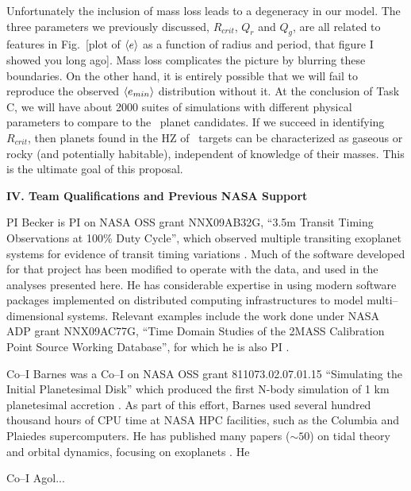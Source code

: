 Unfortunately the inclusion of mass loss leads to a degeneracy in our
model.  The three parameters we previously discussed, $R_{crit}$,
$Q_r$ and $Q_g$, are all related to features in Fig.~[plot of
  $\left< e \right>$ as a function of radius and period, that figure I showed
  you long ago].  Mass loss complicates the picture by blurring these
boundaries.  On the other hand, it is entirely possible that we will
fail to reproduce the observed $\left< e_{min} \right>$ distribution without
it.  At the conclusion of Task C, we will have about 2000 suites of
simulations with different physical parameters to compare to the
\kepler~planet candidates.  If we succeed in identifying $R_{crit}$,
then planets found in the HZ of \kepler~targets can be characterized
as gaseous or rocky (and potentially habitable), independent of
knowledge of their masses.  This is the ultimate goal of this
proposal.

\bigskip
\centerline{\bf IV. Team Qualifications and Previous NASA Support}
\smallskip

PI Becker is PI on NASA OSS grant NNX09AB32G, ``3.5m Transit Timing
Observations at 100\% Duty Cycle'', which observed multiple transiting
exoplanet systems for evidence of transit timing variations
\citep{2011ApJ...731..123K, 2013ApJ...764....8K, 2013ApJ...764L..17B,
  2013arXiv1304.5713K}.  Much of the software developed for that
project has been modified to operate with the \kepler data, and used in
the analyses presented here.  He has considerable expertise in using
modern software packages implemented on distributed computing
infrastructures to model multi--dimensional systems.  Relevant
examples include the work done under NASA ADP grant NNX09AC77G, ``Time
Domain Studies of the 2MASS Calibration Point Source Working
Database'', for which he is also PI
\citep{2012ApJ...748...58D,2013ApJ...764...62D}.

Co--I Barnes was a Co--I on NASA OSS grant 811073.02.07.01.15 ``Simulating the Initial Planetesimal 
Disk'' which produced the first N-body simulation of 1 km planetesimal accretion
\citep{Barnes09_1km}. As part of this effort, Barnes used several hundred thousand hours of
CPU time at NASA HPC facilities, such as the Columbia and Plaiedes supercomputers.
He has published many papers ($\sim 50$) on tidal theory and orbital dynamics, focusing 
on exoplanets \citep[\eg][]{BarnesQuinn01,BarnesRaymond04,BarnesGreenberg06a,Barnes11,Barnes13}. He 

Co--I Agol...

